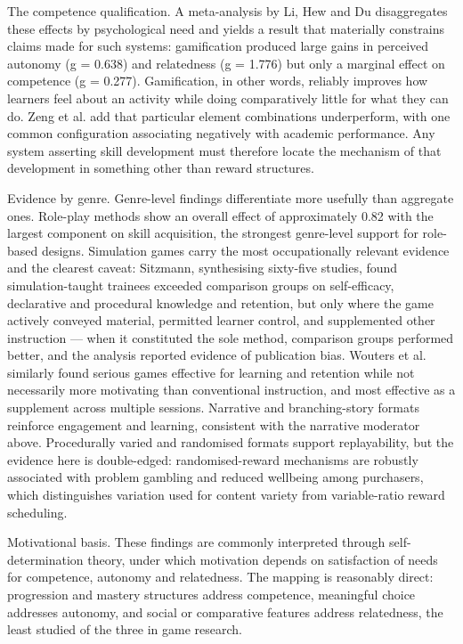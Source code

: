The competence qualification. A meta-\allowbreak{}analysis by Li, Hew and Du\cite{r33} disaggregates these effects by psychological need and yields a result that materially constrains claims made for such systems: gamification produced large gains in perceived autonomy (g = 0.638) and relatedness (g = 1.776) but only a marginal effect on competence (g = 0.277). Gamification, in other words, reliably improves how learners feel about an activity while doing comparatively little for what they can do. Zeng et al.\cite{r34} add that particular element combinations underperform, with one common configuration associating negatively with academic performance. Any system asserting skill development must therefore locate the mechanism of that development in something other than reward structures.

Evidence by genre. Genre-level findings differentiate more usefully than aggregate ones. Role-play methods show an overall effect of approximately 0.82 with the largest component on skill acquisition\cite{r35}, the strongest genre-level support for role-based designs. Simulation games carry the most occupationally relevant evidence and the clearest caveat: Sitzmann\cite{r36}, synthesising sixty-five studies, found simulation-\allowbreak{}taught trainees exceeded comparison groups on self-\allowbreak{}efficacy, declarative and procedural knowledge and retention, but only where the game actively conveyed material, permitted learner control, and supplemented other instruction --- when it constituted the sole method, comparison groups performed better, and the analysis reported evidence of publication bias. Wouters et al.\cite{r37} similarly found serious games effective for learning and retention while not necessarily more motivating than conventional instruction, and most effective as a supplement across multiple sessions. Narrative and branching-\allowbreak{}story formats reinforce engagement and learning\cite{r38}, consistent with the narrative moderator above. Procedurally varied and randomised formats support replayability, but the evidence here is double-\allowbreak{}edged: randomised-\allowbreak{}reward mechanisms are robustly associated with problem gambling and reduced wellbeing among purchasers\cite{r39}, which distinguishes variation used for content variety from variable-\allowbreak{}ratio reward scheduling.

Motivational basis. These findings are commonly interpreted through self-\allowbreak{}determination theory\cite{r40}, under which motivation depends on satisfaction of needs for competence, autonomy and relatedness. The mapping is reasonably direct: progression and mastery structures address competence, meaningful choice addresses autonomy, and social or comparative features address relatedness, the least studied of the three in game research.

